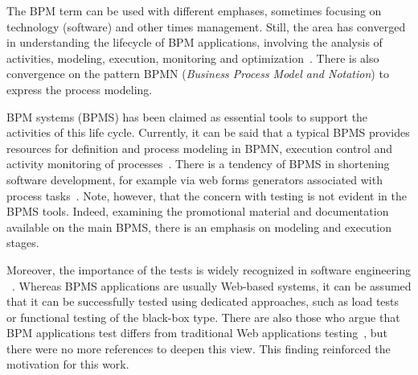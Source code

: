 \documentclass[runningheads,a4paper]{llncs}
\begin{document}
The BPM term can be used with different emphases, sometimes focusing on technology (software) and other times management. Still, the area has converged in understanding the lifecycle of BPM applications, involving the analysis of activities, modeling, execution, monitoring and optimization~\cite{ABPMP}. There is also convergence on the pattern BPMN (\emph{Business Process Model and Notation}) to express the process modeling. 


BPM systems (BPMS) has been claimed as essential tools to support the activities of this life cycle. Currently, it can be said that a typical BPMS provides resources for definition and process modeling in BPMN, execution control and activity monitoring of processes~\cite{forrester}. There is a tendency of BPMS in shortening software development, for example via web forms generators associated with process tasks~\cite{greenresearch}. Note, however, that the concern with testing is not evident in the BPMS tools. Indeed, examining the promotional material and documentation available on the main BPMS, there is an emphasis on modeling and execution stages.


Moreover, the importance of the tests is widely recognized in software engineering ~\cite{swebok14}. 
Whereas BPMS applications are usually Web-based systems, it can be assumed that it can be successfully tested using dedicated approaches, such as load tests or functional testing of the black-box type. There are also those who argue that BPM applications test differs from traditional Web applications testing~\cite{evoke}, but there were no more references to deepen this view. This finding reinforced the motivation for this work. 
\end{document}
